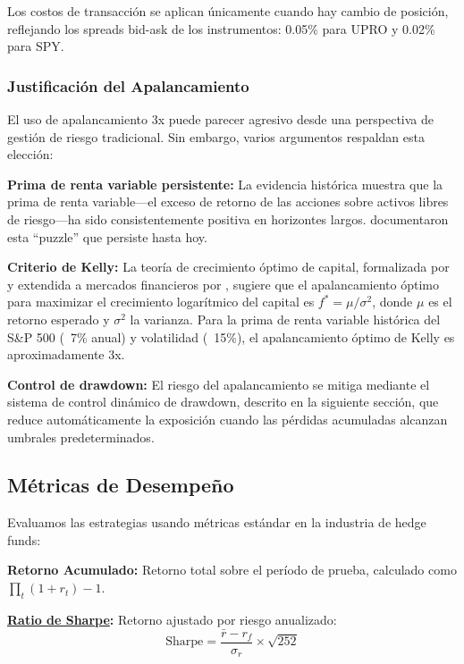 \documentclass[11pt,a4paper]{article}
\newcommand{\gterm}[2]{\hyperref[glos:#1]{#2}}
\begin{document}
Los costos de transacción se aplican únicamente cuando hay cambio de posición, reflejando los spreads bid-ask de los instrumentos: 0.05\% para UPRO y 0.02\% para SPY.

\subsubsection{Justificación del Apalancamiento}

El uso de apalancamiento 3x puede parecer agresivo desde una perspectiva de gestión de riesgo tradicional. Sin embargo, varios argumentos respaldan esta elección:

\textbf{Prima de renta variable persistente:} La evidencia histórica muestra que la prima de renta variable---el exceso de retorno de las acciones sobre activos libres de riesgo---ha sido consistentemente positiva en horizontes largos. \citet{mehra1985} documentaron esta ``puzzle'' que persiste hasta hoy.

\textbf{Criterio de Kelly:} La teoría de crecimiento óptimo de capital, formalizada por \citet{kelly1956} y extendida a mercados financieros por \citet{thorp2006}, sugiere que el apalancamiento óptimo para maximizar el crecimiento logarítmico del capital es $f^* = \mu/\sigma^2$, donde $\mu$ es el retorno esperado y $\sigma^2$ la varianza. Para la prima de renta variable histórica del S\&P 500 (~7\% anual) y volatilidad (~15\%), el apalancamiento óptimo de Kelly es aproximadamente 3x.

\textbf{Control de drawdown:} El riesgo del apalancamiento se mitiga mediante el sistema de control dinámico de drawdown, descrito en la siguiente sección, que reduce automáticamente la exposición cuando las pérdidas acumuladas alcanzan umbrales predeterminados.

\subsection{Métricas de Desempeño}

Evaluamos las estrategias usando métricas estándar en la industria de hedge funds:

\textbf{Retorno Acumulado:} Retorno total sobre el período de prueba, calculado como $\prod_t(1+r_t) - 1$.

\textbf{\gterm{sharpe}{Ratio de Sharpe}:} Retorno ajustado por riesgo anualizado:
\begin{equation}
\text{Sharpe} = \frac{\bar{r} - r_f}{\sigma_r} \times \sqrt{252}
\end{equation}
\end{document}
